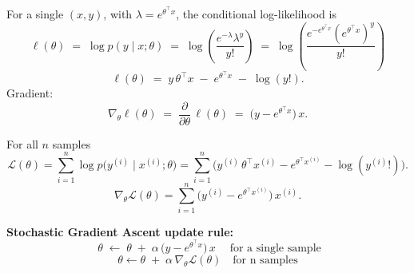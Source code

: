 \begin{answer}

For a single $(x,y)$, with $\lambda = e^{\theta^\top x}$, the conditional log-likelihood is
\[
\ell(\theta) \;=\; \log p(y\mid x;\theta) \;=\; \log(\frac{e^{-\lambda}\lambda^y}{y!}) \;=\; \log(\frac{e^{-e^{\theta^\top x}}(e^{\theta^\top x})^y}{y!})
\]
\[
\ell(\theta) \;=\; y\,\theta^\top x \;-\; e^{\theta^\top x} \;-\; \log(y!).
\]
Gradient:
\[
\nabla_\theta \ell(\theta) \;=\; \frac{\partial}{\partial \theta}\,\ell(\theta) \;=\; \big(y - e^{\theta^\top x}\big)\,x.
\]

For all $n$ samples
\[
\mathcal{L}(\theta)
= \sum_{i=1}^n \log p\!\big(y^{(i)}\mid x^{(i)};\theta\big)
= \sum_{i=1}^n \Big( y^{(i)}\,\theta^\top x^{(i)} - e^{\theta^\top x^{(i)}} - \log(y^{(i)}!) \Big).
\]
\[
\nabla_\theta \mathcal{L}(\theta)
= \sum_{i=1}^n \big( y^{(i)} - e^{\theta^\top x^{(i)}} \big)\, x^{(i)}.
\]

\textbf{Stochastic Gradient Ascent update rule:}
\[
\;\theta \;\leftarrow\; \theta \;+\; \alpha\,\big(y - e^{\theta^\top x}\big)\,x\; \quad \text{for a single sample}
\]
\[
\theta \leftarrow \theta \;+\; \alpha\, \nabla_\theta \mathcal{L}(\theta) \quad \text{for n samples}
\]





\end{answer}
